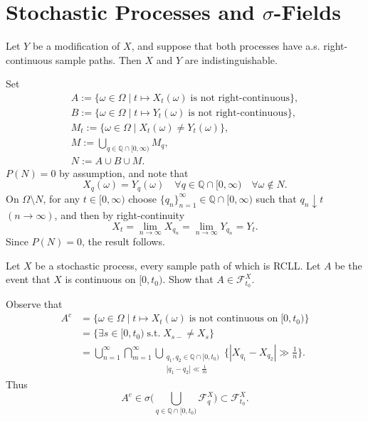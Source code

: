 \documentclass{report}
\begin{document}
\section{Stochastic Processes and \( \sigma \)-Fields}
\setcounter{exe}{4} %
\begin{prob}
	Let \( Y\) be a modification of \( X\), and suppose that both processes have
	a.s. right-continuous sample paths. Then \( X\) and \( Y\) are indistinguishable. 
\end{prob}
\begin{prf}
	Set
	\begin{gather*}
		A:=\{\omega \in \Omega \mid t \mapsto X_t(\omega) \; \text{is not right-continuous}\}, \\
		B:=\{\omega \in \Omega \mid t \mapsto Y_t(\omega) \; \text{is not right-continuous}\}, \\
		M_t:=\{\omega \in \Omega \mid X_t(\omega)\neq Y_t(\omega)\},\\
		M:=\bigcup_{q\in \mathbb{Q}\cap [0,\infty) } M_q,\\
		N:=A\cup B\cup M.
	\end{gather*}
	\( P(N)=0\) by assumption, and note that
	\[X_q(\omega)=Y_q(\omega)\quad \forall q\in \mathbb{Q}\cap [0,\infty)\quad \forall \omega \notin N.\]
	On \( \Omega \setminus N\), for any \( t\in [0,\infty)\) choose \( \{q_n \} _{n=1}^{\infty}\in \mathbb{Q}\cap [0,\infty)\)  such that \( q_n \downarrow t\) \( (n\to \infty)\),
	and then by right-continuity
	\[X_t=\lim_{n\to \infty}X_{q_n}=\lim_{n\to \infty}Y_{q_n}=Y_t.\]
	Since \( P(N)=0\), the result follows.
\end{prf}

\setcounter{exe}{6} %
\begin{exe} 
	Let \( X\) be a stochastic process, every sample path of which is RCLL.
	Let \( A\) be the
	event that \( X\) is continuous on \( [0,t_0) \). Show that \( A\in \mathscr{F}_{t_0}^X \). 
\end{exe}
\begin{prf}
	Observe that
	\begin{align*}
		A^c & =\{\omega \in \Omega \mid t\mapsto X_t(\omega) \;
		\text{is not continuous on}\; [0,t_0)\}                                                                  \\
		    & =\{\exists s\in[0,t_0)\; \text{s.t.}\;
		X_{s-}\neq X_{s}\}                                                                                       \\
		    & =\bigcup_{n=1}^{\infty}\bigcap_{m=1}^{\infty}\bigcup_{\substack{q_1, q_2\in \mathbb{Q}\cap [0,t_0) \\ |q_1-q_2|\ll \frac{1}{m}}}
		\{|X_{q_1}-X_{q_2}|\gg \frac{1}{n}\}.
	\end{align*}
	Thus
	\[A^c\in \sigma \big(\bigcup_{q\in \mathbb{Q}\cap [0,t_0)}\mathscr{F}_{q}^X\big)\subset \mathscr{F}_{t_0}^X.\]
\end{prf}
\end{document}
